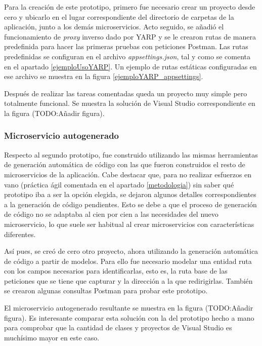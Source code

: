 \documentclass[11pt,spanish,listoffigures]{tfgetsinf}
\begin{document}
Para la creación de este prototipo, primero fue necesario crear un proyecto desde cero y ubicarlo en el lugar correspondiente del directorio de carpetas de la aplicación, junto a los demás microservicios. Acto seguido, se añadió el funcionamiento de \emph{proxy} inverso dado por YARP y se le crearon rutas de manera predefinida para hacer las primeras pruebas con peticiones Postman. Las rutas predefinidas se configuran en el archivo \emph{appsettings.json}, tal y como se comenta en el apartado \ref{ejemploUsoYARP}. Un ejemplo de rutas estáticas configuradas en ese archivo se muestra en la figura \ref{ejemploYARP_appsettings}.

Después de realizar las tareas comentadas queda un proyecto muy simple pero totalmente funcional. Se muestra la solución de Visual Studio correspondiente en la figura (TODO:Añadir figura).



			\subsubsection{Microservicio autogenerado}

Respecto al segundo prototipo, fue construido utilizando las mismas herramientas de generación automática de código con las que fueron construidos el resto de microservicios de la aplicación. Cabe destacar que, para no realizar esfuerzos en vano (práctica ágil comentada en el apartado \ref{metodologia}) sin saber qué prototipo iba a ser la opción elegida, se dejaron algunos detalles correspondientes a la generación de código pendientes. Esto se debe a que el proceso de generación de código no se adaptaba al cien por cien a las necesidades del nuevo microservicio, lo que suele ser habitual al crear microservicios con características diferentes.

Así pues, se creó de cero otro proyecto, ahora utilizando la generación automática de código a partir de modelos. Para ello fue necesario modelar una entidad ruta con los campos necesarios para identificarlas, esto es, la ruta base de las peticiones que se tiene que capturar y la dirección a la que redirigirlas. También se crearon algunas consultas Postman para probar este prototipo.

El microservicio autogenerado resultante se muestra en la figura (TODO:Añadir figura). Es interesante comparar esta solución con la del prototipo hecho a mano para comprobar que la cantidad de clases y proyectos de Visual Studio es muchísimo mayor en este caso.
\end{document}
